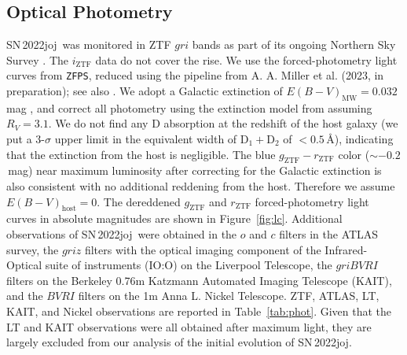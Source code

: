 \documentclass[twocolumn]{aastex631}
\newcommand{\sn}{SN\,2022joj}
\begin{document}
\begin{CJK*}{UTF8}{gbsn}


\subsection{Optical Photometry}
\sn\ was monitored in ZTF $gri$ bands as part of its ongoing Northern Sky Survey \citep{Bellm_ZTF_2019b}. The $i_\mathrm{ZTF}$ data do not cover the rise. We use the forced-photometry light curves from \texttt{ZFPS}, reduced using the pipeline from A. A. Miller et al. (2023, in preparation); see also \citet{Yao_2019}. We adopt a Galactic extinction of ${E(B-V)_\mathrm{MW}}=0.032$\,mag \citep{Schlafly2011}, and correct all photometry using the extinction model from \citet{Fitzpatrick1999} assuming $R_V=3.1$. We do not find any  D absorption at the redshift of the host galaxy (we put a 3-$\sigma$ upper limit in the equivalent width of  $\mathrm{D_1}+\mathrm{D_2}$ of $<$$0.5$\,\r{A}), indicating that the extinction from the host is negligible. The blue $g_\mathrm{ZTF}-r_\mathrm{ZTF}$ color ($\sim$$-0.2$\,mag) near maximum luminosity after correcting for the Galactic extinction is also consistent with no additional reddening from the host. Therefore we assume ${E(B-V)}_\mathrm{host}=0$. The dereddened $g_\mathrm{ZTF}$ and $r_\mathrm{ZTF}$ forced-photometry light curves in absolute magnitudes are shown in Figure~\ref{fig:lc}. 
Additional observations of \sn\ were obtained in the $o$ and $c$ filters in the ATLAS survey, the $griz$ filters with the optical imaging component of the Infrared-Optical suite of instruments (IO:O) on the Liverpool Telescope, the $griBVRI$ filters on the Berkeley 0.76m Katzmann Automated Imaging Telescope (KAIT), and the $BVRI$ filters on the 1m Anna L. Nickel Telescope. ZTF, ATLAS, LT, KAIT, and Nickel observations are reported in Table~\ref{tab:phot}. Given that the LT and KAIT observations were all obtained after maximum light, they are largely excluded from our analysis of the initial evolution of \sn.


\end{CJK*}
\end{document}
